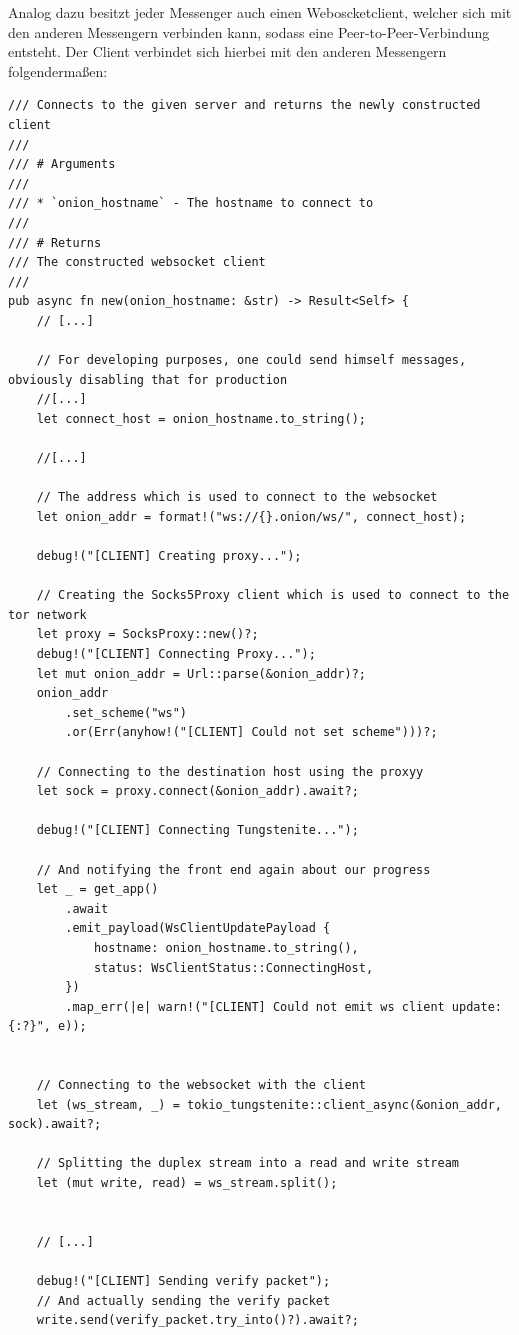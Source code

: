 \documentclass[a4paper,ngerman, headheight=28pt,12pt]{scrartcl}
\begin{document}
Analog dazu besitzt jeder Messenger auch einen Weboscketclient, welcher sich mit den anderen Messengern verbinden kann, sodass eine Peer-to-Peer-Verbindung entsteht. Der Client verbindet sich hierbei mit den anderen Messengern folgendermaßen:
\begin{verbatim}
/// Connects to the given server and returns the newly constructed client
///
/// # Arguments
///
/// * `onion_hostname` - The hostname to connect to
///
/// # Returns
/// The constructed websocket client
/// 
pub async fn new(onion_hostname: &str) -> Result<Self> {
    // [...]

    // For developing purposes, one could send himself messages, obviously disabling that for production
    //[...]
    let connect_host = onion_hostname.to_string();

    //[...]

    // The address which is used to connect to the websocket
    let onion_addr = format!("ws://{}.onion/ws/", connect_host);

    debug!("[CLIENT] Creating proxy...");

    // Creating the Socks5Proxy client which is used to connect to the tor network
    let proxy = SocksProxy::new()?;
    debug!("[CLIENT] Connecting Proxy...");
    let mut onion_addr = Url::parse(&onion_addr)?;
    onion_addr
        .set_scheme("ws")
        .or(Err(anyhow!("[CLIENT] Could not set scheme")))?;

    // Connecting to the destination host using the proxyy
    let sock = proxy.connect(&onion_addr).await?;

    debug!("[CLIENT] Connecting Tungstenite...");

    // And notifying the front end again about our progress
    let _ = get_app()
        .await
        .emit_payload(WsClientUpdatePayload {
            hostname: onion_hostname.to_string(),
            status: WsClientStatus::ConnectingHost,
        })
        .map_err(|e| warn!("[CLIENT] Could not emit ws client update: {:?}", e));


    // Connecting to the websocket with the client
    let (ws_stream, _) = tokio_tungstenite::client_async(&onion_addr, sock).await?;

    // Splitting the duplex stream into a read and write stream
    let (mut write, read) = ws_stream.split();


    // [...]

    debug!("[CLIENT] Sending verify packet");
    // And actually sending the verify packet
    write.send(verify_packet.try_into()?).await?;


\end{verbatim}
\end{document}
